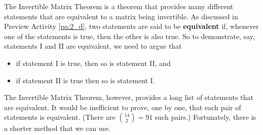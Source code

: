 The Invertible Matrix Theorem is a theorem that provides many different statements that are equivalent to a matrix being invertible. As discussed in Preview Activity \ref{pa:2_d}, two statements are said to be \textbf{equivalent} if, whenever one of the statements is true, then the other is also true. So to demonstrate, say, statements I and II are equivalent, we need to argue that 
\begin{itemize}
\item if statement I is true, then so is statement II, and 
\item if statement II is true then so is statement I. 
\end{itemize}
The Invertible Matrix Theorem, however, provides a long list of statements that are equivalent. It would be inefficient to prove, one by one, that each pair of statements is equivalent. (There are $\binom{14}{2} = 91$ such pairs.) Fortunately, there is a shorter method that we can use. 



